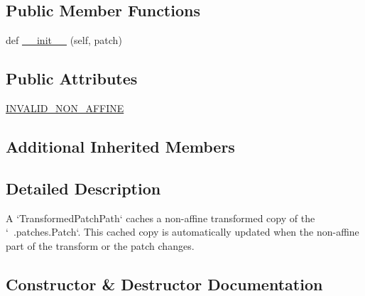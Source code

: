 \subsection*{Public Member Functions}
\begin{DoxyCompactItemize}
\item 
def \hyperlink{classmatplotlib_1_1transforms_1_1TransformedPatchPath_a77c661fe30e030dd77c033790422799d}{\+\_\+\+\_\+init\+\_\+\+\_\+} (self, patch)
\end{DoxyCompactItemize}
\subsection*{Public Attributes}
\begin{DoxyCompactItemize}
\item 
\hyperlink{classmatplotlib_1_1transforms_1_1TransformedPatchPath_a49d1d185fb906b03139739e3694966c6}{I\+N\+V\+A\+L\+I\+D\+\_\+\+N\+O\+N\+\_\+\+A\+F\+F\+I\+NE}
\end{DoxyCompactItemize}
\subsection*{Additional Inherited Members}


\subsection{Detailed Description}
\begin{DoxyVerb}A `TransformedPatchPath` caches a non-affine transformed copy of the
`~.patches.Patch`. This cached copy is automatically updated when the
non-affine part of the transform or the patch changes.
\end{DoxyVerb}
 

\subsection{Constructor \& Destructor Documentation}
\mbox{\label{classmatplotlib_1_1transforms_1_1TransformedPatchPath_a77c661fe30e030dd77c033790422799d}} 
